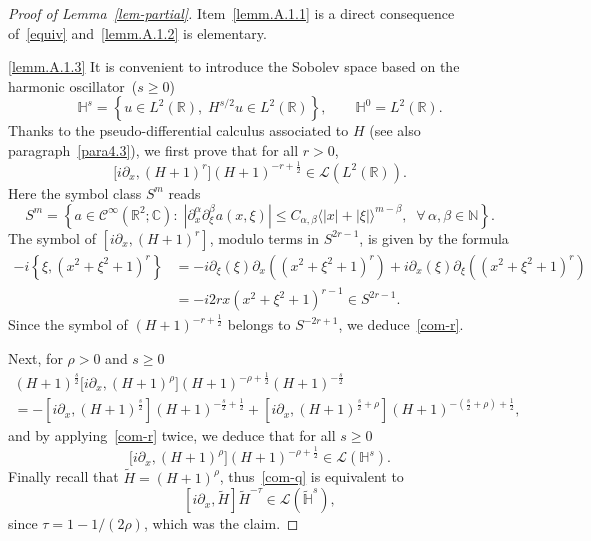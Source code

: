 \documentclass[10pt]{amsart}
\theoremstyle{definition}\newtheorem{defi}[theo]{Definition}\newtheorem{rema}[theo]{Remark}\newtheorem{exam}[theo]{Example}\newtheorem{exem}[theo]{Example}\newtheorem{nota}[theo]{Notation}
\newcommand{\C}{\mathbb{C}}
\newcommand{\R}{\mathbb{R}}
\newcommand{\HH}{\mathbb{H}}
\newcommand{\N}{\mathbb{N}}
\newcommand{\clL}{\mathcal{L}}
\newcommand{\clC}{\mathcal{C}}
\newcommand{\wt}{\widetilde}
\newcommand{\<}{\langle}
\renewcommand{\>}{\rangle}
\let\oldforall\forall
\renewcommand*{\forall}{\mathrel{\oldforall}}
\begin{document}
\begin{proof}[Proof of Lemma~\ref{lem-partial}]
Item~\eqref{lemm.A.1.1}  is a direct consequence of~\eqref{equiv} and~\eqref{lemm.A.1.2} is elementary.

\eqref{lemm.A.1.3}  It is convenient to introduce the Sobolev space based on the harmonic oscillator~($s\geq 0$)
\[
{\HH}^{s} = \left\{ u\in L^2(\R),\; H^{s/2}u\in L^2(\R)\right\}, \qquad {\HH}^{0} =L^2(\R).
\]
Thanks to the pseudo-differential calculus associated to $H$ (see also paragraph~\ref{para4.3}), we first prove that for all $r>0$,
\begin{equation}\label{com-r}
\big[i \partial_x, (H+1)^r\big] (H+1)^{-r+\frac12} \in \clL\left(L^2(\R)\right).
\end{equation}
Here the symbol class $S^m$ reads
\[
S^m =\left\{ a \in \clC^\infty\left(\R^2; \C\right) : \; \left|\partial_{x}^{\alpha} \partial_{\xi}^{\beta} a(x, \xi)\right|
\leq C_{\alpha,\beta}\langle |x|+|\xi|\rangle^{m-\beta}, \;\; \forall \,
\alpha, \beta \in \N\right\}.
\]
The symbol of $ [i \partial_x, (H+1)^r] $, modulo terms in $S^{2r-1}$, is given by the formula
\begin{align*}
-i \left\{ \xi, \left(x^2 +\xi^2+1\right)^{r} \right\} &=-i\partial_{\xi} (\xi) \partial_{x} \left(\left(x^2 +\xi^2+1\right)^{r} \right)+i\partial_{x} (\xi) \partial_{\xi} \left(\left(x^2 +\xi^2+1\right)^{r} \right) \\
&=-i 2r x \left(x^2 +\xi^2+1\right)^{r-1} \in S^{2r-1}.
\end{align*}
Since the symbol of $ (H+1)^{-r+\frac12} $ belongs to $S^{-2r+1}$, we deduce~\eqref{com-r}.

Next, for $\rho>0$ and $s \geq 0$
\begin{multline*}
(H+1)^{\frac{s}2} \big[i \partial_x, (H+1)^{\rho}\big] (H+1)^{-\rho+\frac12} (H+1)^{-\frac{s}2}
\\
=- \left[i \partial_x, (H+1)^\frac{s}2\right] (H+1)^{-\frac{s}2 +\frac12} +\left[i
\partial_x, (H+1)^{\frac{s}2+\rho}\right] (H+1)^{-\left(\frac{s}2 +\rho\right)+\frac12},
\end{multline*}
and by applying~\eqref{com-r} twice, we deduce that for all $s\geq 0$
\begin{equation}\label{com-q}
\big[i \partial_x, (H+1)^{\rho}\big] (H+1)^{-\rho+\frac12} \in \clL\left({\HH}^{s}\right).
\end{equation}
Finally recall that $\wt{H}=(H+1)^{\rho}$, thus~\eqref{com-q} is equivalent to
\[
\left[i \partial_x, \wt{H}\right] \wt{H}^{- \tau } \in \clL\left(\wt{\HH}^{s}\right),
\]
since $\tau = 1-1/(2 \rho)$, which was the claim.
\end{proof}
\end{document}
